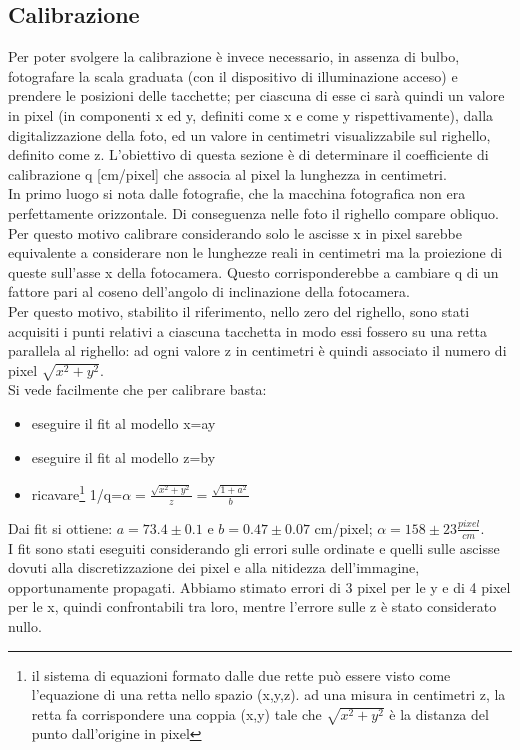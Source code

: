 \subsection{Calibrazione}
Per poter svolgere la calibrazione è invece necessario, in assenza di bulbo, fotografare la scala graduata (con il dispositivo di illuminazione acceso) e prendere le posizioni delle tacchette; per ciascuna di esse ci sarà quindi un valore in pixel (in componenti x ed y, definiti come x e come y rispettivamente), dalla digitalizzazione della foto, ed un valore in centimetri visualizzabile sul righello, definito come z. L'obiettivo di questa sezione è di determinare il coefficiente di calibrazione q [cm/pixel] che associa al pixel la lunghezza in centimetri.\\  
In primo luogo si nota dalle fotografie, che la macchina fotografica non era perfettamente orizzontale. Di conseguenza nelle foto il righello compare obliquo. Per questo motivo calibrare considerando solo le ascisse x in pixel sarebbe equivalente a considerare non le lunghezze reali in centimetri ma la proiezione di queste sull'asse x della fotocamera. Questo corrisponderebbe a cambiare q di un fattore pari al coseno dell'angolo di inclinazione della fotocamera.\\
Per questo motivo, stabilito il riferimento, nello zero del righello, sono stati acquisiti i punti relativi a ciascuna tacchetta in modo essi fossero su una retta parallela al righello: ad ogni valore z in centimetri è quindi associato il numero di pixel $\sqrt{x^2 +y^2}$.\\ 
Si vede facilmente che per calibrare basta: 
\begin{itemize}
\item{eseguire il fit al modello x=ay}
\item{eseguire il fit al modello z=by}
\item{ricavare\footnote{il sistema di equazioni formato dalle due rette può essere visto come l'equazione di una retta nello spazio (x,y,z). ad una misura in centimetri z, la retta fa corrispondere una coppia (x,y) tale che $\sqrt{x^2+y^2}$ è la distanza del punto dall'origine in pixel} 1/q=$\alpha = \frac{\sqrt{x^2+y^2}}{z} = \frac{ \sqrt{1+a^2}}{b}$}
\end{itemize}
Dai fit si ottiene: $a = 73.4 \pm 0.1 $ e $b = 0.47 \pm 0.07$ cm/pixel; $ \alpha = 158 \pm 23 \frac{pixel}{cm}$.\\ 
I fit sono stati eseguiti considerando gli errori sulle ordinate e quelli sulle ascisse dovuti alla discretizzazione dei pixel e alla nitidezza dell'immagine, opportunamente propagati. Abbiamo stimato errori di 3 pixel per le y e di 4 pixel per le x, quindi confrontabili tra loro, mentre l'errore sulle z è stato considerato nullo.
